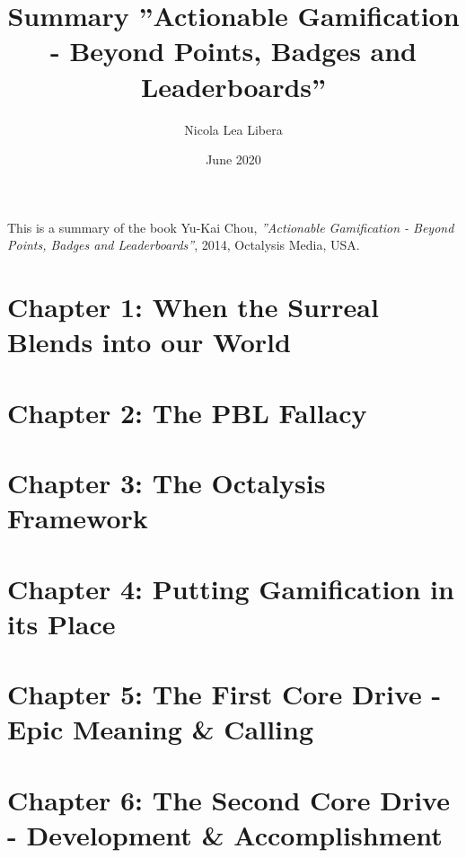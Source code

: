 \documentclass{article}
\theoremstyle{definition}
\theoremstyle{remark}
\begin{document}
\title{Summary ''Actionable Gamification - Beyond Points, Badges and Leaderboards''}
\author{\vspace{-2.0cm} Nicola Lea Libera}
\date{June 2020}
\maketitle

This is a summary of the book Yu-Kai Chou, \textit{''Actionable Gamification - Beyond Points, Badges and Leaderboards''}, 2014, Octalysis Media, USA.

\tableofcontents

\newpage

\section{Chapter 1: When the Surreal Blends into our World}


\newpage

\section{Chapter 2: The PBL Fallacy}


\newpage

\section{Chapter 3: The Octalysis Framework}


\newpage

\section{Chapter 4: Putting Gamification in its Place}


\newpage

\section{Chapter 5: The First Core Drive - Epic Meaning \& Calling}


\newpage

\section{Chapter 6: The Second Core Drive - Development \& Accomplishment}


\newpage
\end{document}
